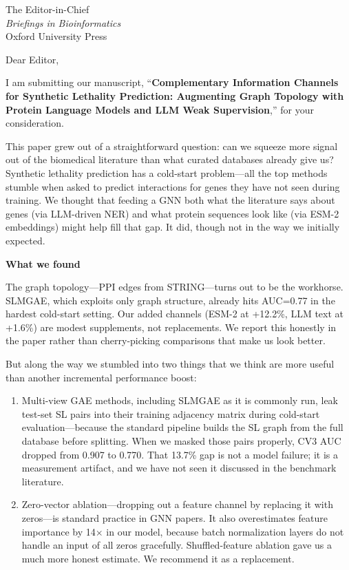 \documentclass[12pt,a4paper]{letter}
\begin{document}
\begin{letter}{The Editor-in-Chief\\
\textit{Briefings in Bioinformatics}\\
Oxford University Press}

\opening{Dear Editor,}

I am submitting our manuscript, ``\textbf{Complementary Information Channels for Synthetic Lethality Prediction: Augmenting Graph Topology with Protein Language Models and LLM Weak Supervision},'' for your consideration.

This paper grew out of a straightforward question: can we squeeze more signal out of the biomedical literature than what curated databases already give us? Synthetic lethality prediction has a cold-start problem---all the top methods stumble when asked to predict interactions for genes they have not seen during training. We thought that feeding a GNN both what the literature says about genes (via LLM-driven NER) and what protein sequences look like (via ESM-2 embeddings) might help fill that gap. It did, though not in the way we initially expected.

\medskip
\noindent\textbf{What we found}

The graph topology---PPI edges from STRING---turns out to be the workhorse. SLMGAE, which exploits only graph structure, already hits AUC=0.77 in the hardest cold-start setting. Our added channels (ESM-2 at +12.2\%, LLM text at +1.6\%) are modest supplements, not replacements. We report this honestly in the paper rather than cherry-picking comparisons that make us look better.

But along the way we stumbled into two things that we think are more useful than another incremental performance boost:

\begin{enumerate}
    \item Multi-view GAE methods, including SLMGAE as it is commonly run, leak test-set SL pairs into their training adjacency matrix during cold-start evaluation---because the standard pipeline builds the SL graph from the full database before splitting. When we masked those pairs properly, CV3 AUC dropped from 0.907 to 0.770. That 13.7\% gap is not a model failure; it is a measurement artifact, and we have not seen it discussed in the benchmark literature.

    \item Zero-vector ablation---dropping out a feature channel by replacing it with zeros---is standard practice in GNN papers. It also overestimates feature importance by 14$\times$ in our model, because batch normalization layers do not handle an input of all zeros gracefully. Shuffled-feature ablation gave us a much more honest estimate. We recommend it as a replacement.
\end{enumerate}


\end{letter}
\end{document}

